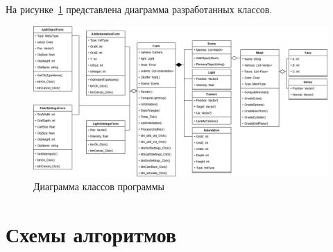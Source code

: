 На рисунке~\ref{fig:uml} представлена диаграмма разработанных классов.

\begin{figure}[H]
    \centering
    \includegraphics[width=1\linewidth]{img/CG_CP.drawio.png}
    \caption{Диаграмма классов программы}
    \label{fig:uml}
\end{figure}

\section{Схемы алгоритмов}

